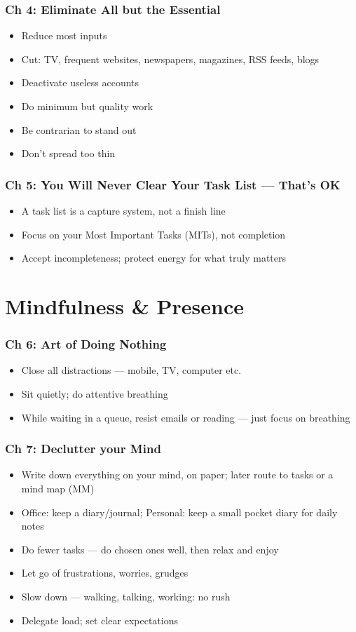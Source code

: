 \begin{frame}[fragile]
\frametitle{Ch 4: Eliminate All but the Essential}
\begin{itemize}
\item Reduce most inputs
\item Cut: TV, frequent websites, newspapers, magazines, RSS feeds, blogs
\item Deactivate useless accounts
\item Do minimum but quality work
\item Be contrarian to stand out
\item Don't spread too thin
\end{itemize}
\end{frame}

\begin{frame}[fragile]
\frametitle{Ch 5: You Will Never Clear Your Task List --- That's OK}
\begin{itemize}
\item A task list is a capture system, not a finish line
\item Focus on your Most Important Tasks (MITs), not completion
\item Accept incompleteness; protect energy for what truly matters
\end{itemize}
\end{frame}

\section{Mindfulness \& Presence}

\begin{frame}[fragile]
\frametitle{Ch 6: Art of Doing Nothing}
\begin{itemize}
\item Close all distractions --- mobile, TV, computer etc.
\item Sit quietly; do attentive breathing
\item While waiting in a queue, resist emails or reading --- just focus on breathing
\end{itemize}
\end{frame}

\begin{frame}[fragile]
\frametitle{Ch 7: Declutter your Mind}
\begin{itemize}
\item Write down everything on your mind, on paper; later route to tasks or a mind map (MM)
\item Office: keep a diary/journal; Personal: keep a small pocket diary for daily notes
\item Do fewer tasks --- do chosen ones well, then relax and enjoy
\item Let go of frustrations, worries, grudges
\item Slow down --- walking, talking, working: no rush
\item Delegate load; set clear expectations
\end{itemize}
\end{frame}

